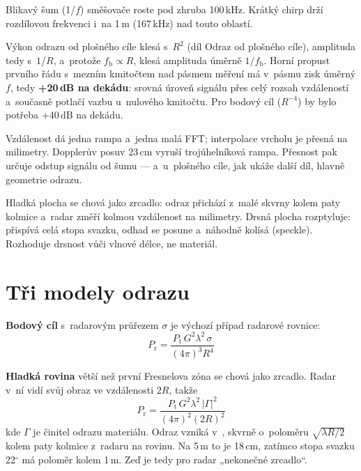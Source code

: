 \documentclass[czech]{skyren}
\begin{document}
Blikavý šum (1/$f$) směšovače roste pod zhruba 100\,kHz. Krátký chirp drží
rozdílovou frekvenci i~na 1\,m (167\,kHz) nad touto oblastí.

Výkon odrazu od plošného cíle klesá s~$R^2$ (díl Odraz od plošného cíle), amplituda tedy
s~$1/R$, a~protože $f_\mathrm{b} \propto R$, klesá amplituda úměrně
$1/f_\mathrm{b}$. Horní propust prvního řádu s~mezním kmitočtem nad pásmem
měření má v~pásmu zisk úměrný $f$, tedy \textbf{+20\,dB na dekádu}: srovná
úroveň signálu přes celý rozsah vzdáleností a~současně potlačí vazbu
u~nulového kmitočtu. Pro bodový cíl ($R^{-4}$) by bylo potřeba +40\,dB na
dekádu.

\begin{skyrentakeaway}
Vzdálenost dá jedna rampa a~jedna malá FFT; interpolace vrcholu je přesná na
milimetry. Dopplerův posuv 23\,cm vyruší trojúhelníková rampa. Přesnost pak
určuje odstup signálu od šumu --- a~u~plošného cíle, jak ukáže další díl,
hlavně geometrie odrazu.
\end{skyrentakeaway}


\begin{skyrenglance}
Hladká plocha se chová jako zrcadlo: odraz přichází z~malé skvrny kolem
paty kolmice a~radar změří kolmou vzdálenost na milimetry. Drsná plocha
rozptyluje: přispívá celá stopa svazku, odhad se posune a~náhodně kolísá
(speckle). Rozhoduje drsnost vůči vlnové délce, ne materiál.
\end{skyrenglance}

\section{Tři modely odrazu}

\textbf{Bodový cíl} s~radarovým průřezem $\sigma$ je výchozí případ radarové
rovnice:
\[
P_\mathrm{r} = \frac{P_\mathrm{t}\,G^2\lambda^2\,\sigma}{(4\pi)^3 R^4}
\]

\textbf{Hladká rovina} větší než první Fresnelova zóna se chová jako zrcadlo.
Radar v~ní vidí svůj obraz ve vzdálenosti $2R$, takže
\[
P_\mathrm{r} = \frac{P_\mathrm{t}\,G^2\lambda^2\,|\Gamma|^2}{(4\pi)^2 (2R)^2}
\]
kde $\Gamma$ je činitel odrazu materiálu. Odraz vzniká v~, skvrně o~poloměru $\sqrt{\lambda R/2}$ kolem paty kolmice
z~radaru na rovinu. Na 5\,m to je 18\,cm, zatímco stopa svazku 22$^\circ$ má
poloměr kolem 1\,m. Zeď je tedy pro radar „nekonečné zrcadlo“.
\end{document}
